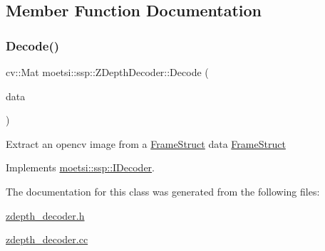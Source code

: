 \subsection{Member Function Documentation}
\mbox{\label{classmoetsi_1_1ssp_1_1ZDepthDecoder_a43226095658d616f7e38df1d43c2f88a}} 
\subsubsection{\texorpdfstring{Decode()}{Decode()}}
{\footnotesize\ttfamily cv\+::\+Mat moetsi\+::ssp\+::\+Z\+Depth\+Decoder\+::\+Decode (\begin{DoxyParamCaption}\item[{\hyperlink{structmoetsi_1_1ssp_1_1FrameStruct}{Frame\+Struct} \&}]{data }\end{DoxyParamCaption})\hspace{0.3cm}{\ttfamily [virtual]}}

Extract an opencv image from a \hyperlink{structmoetsi_1_1ssp_1_1FrameStruct}{Frame\+Struct}  data \hyperlink{structmoetsi_1_1ssp_1_1FrameStruct}{Frame\+Struct} 

Implements \hyperlink{classmoetsi_1_1ssp_1_1IDecoder_a1c06604dc4107d3668a4e791c13cc063}{moetsi\+::ssp\+::\+I\+Decoder}.



The documentation for this class was generated from the following files\+:\begin{DoxyCompactItemize}
\item 
\hyperlink{zdepth__decoder_8h}{zdepth\+\_\+decoder.\+h}\item 
\hyperlink{zdepth__decoder_8cc}{zdepth\+\_\+decoder.\+cc}\end{DoxyCompactItemize}
